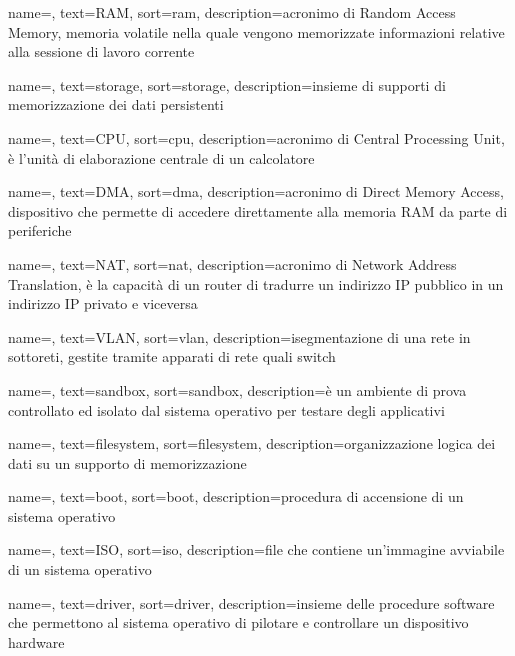 {
    name=,
    text=RAM,
    sort=ram, 
    description={acronimo di Random Access Memory, memoria volatile nella quale vengono memorizzate informazioni relative alla sessione di lavoro corrente}
}

{
    name=,
    text=storage,
    sort=storage, 
    description={insieme di supporti di memorizzazione dei dati persistenti}
}

{
    name=,
    text=CPU,
    sort=cpu, 
    description={acronimo di Central Processing Unit, è l'unità di elaborazione centrale di un calcolatore}
}

{
    name=,
    text=DMA,
    sort=dma, 
    description={acronimo di Direct Memory Access, dispositivo che permette di accedere direttamente alla memoria RAM da parte di periferiche}
}

{
    name=,
    text=NAT,
    sort=nat, 
    description={acronimo di Network Address Translation, è la capacità di un router di tradurre un indirizzo IP pubblico in un indirizzo IP privato e viceversa}
}

{
    name=,
    text=VLAN,
    sort=vlan, 
    description={isegmentazione di una rete in sottoreti, gestite tramite apparati di rete quali switch}
}

{
    name=,
    text=sandbox,
    sort=sandbox, 
    description={è un ambiente di prova controllato ed isolato dal sistema operativo per testare degli applicativi}
}

{
    name=,
    text=filesystem,
    sort=filesystem, 
    description={organizzazione logica dei dati su un supporto di memorizzazione}
}

{
    name=,
    text=boot,
    sort=boot, 
    description={procedura di accensione di un sistema operativo}
}

{
    name=,
    text=ISO,
    sort=iso, 
    description={file che contiene un'immagine avviabile di un sistema operativo}
}

{
    name=,
    text=driver,
    sort=driver, 
    description={insieme delle procedure software che permettono al sistema operativo di pilotare e controllare un dispositivo hardware}
}

